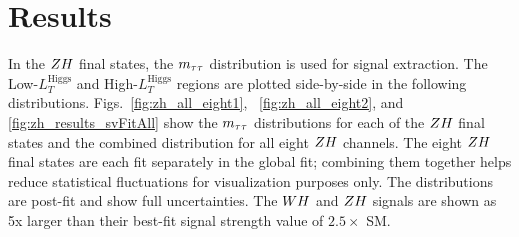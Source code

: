\section{Results}
\label{sec:vh_results}


In the $ZH$ final states, the $m_{\tau\tau}$ distribution is
used for signal extraction. The Low-$L_{T}^{\textrm{Higgs}}$ and
High-$L_{T}^{\textrm{Higgs}}$ regions are plotted side-by-side
in the following distributions. 
Figs.~\ref{fig:zh_all_eight1}, ~\ref{fig:zh_all_eight2}, 
and \ref{fig:zh_results_svFitAll} show the
$m_{\tau\tau}$ distributions for each of the $ZH$ final states and
the combined distribution for all eight $ZH$ channels.
The eight $ZH$ final states are each fit separately in the global
fit; combining them together helps reduce statistical
fluctuations for visualization purposes only.
The distributions are post-fit and show full uncertainties.
The $WH$ and $ZH$ signals are shown as 5x larger than their best-fit
signal strength value of $2.5 \times$ SM.


